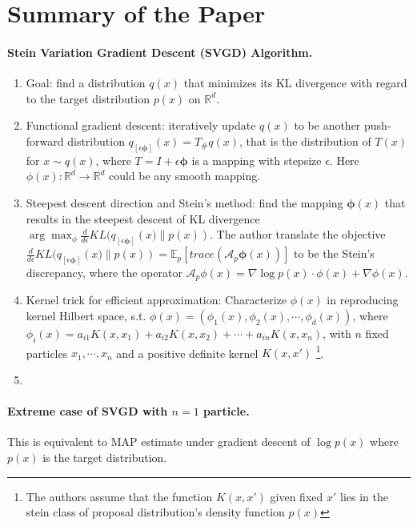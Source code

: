 \section{Summary of the Paper}

\paragraph{Stein Variation Gradient Descent (SVGD) Algorithm.}

\begin{enumerate}
    \item Goal: find a distribution $q(x)$ that minimizes its KL divergence with regard to the target distribution $p(x)$ on $\mathbb{R}^d$.
    \item Functional gradient descent: iteratively update $q(x)$ to be another push-forward distribution $q_{[\epsilon\mathbf{\phi}]}(x) = T_{\#}q(x)$, that is the distribution of $T(x)$ for $x\sim q(x)$, where $T= I + \epsilon \mathbf{\phi}$ is a mapping with stepsize $\epsilon$. Here $\phi(x): \mathbb{R}^d\rightarrow \mathbb{R}^d$ could be any smooth mapping.
    \item Steepest descent direction and Stein's method: find the mapping $\mathbf{\phi}(x)$ that results in the steepest descent of KL divergence $\arg\max_{\phi} \frac{d}{d \epsilon} KL(q_{[\epsilon\mathbf{\phi}]}\left(x)\lVert p(x)\right)$. The author translate the objective $\frac{d}{d \epsilon}KL(q_{[\epsilon\mathbf{\phi}]}\left(x)\lVert p(x)\right) = \mathbb{E}_p\left[trace\left(\mathcal{A}_p \mathbf{\phi}(x)\right)\right]$ to be the Stein's discrepancy, where the operator $\mathcal{A}_p \phi(x)= \nabla \log p(x) \cdot \phi(x) + \nabla\phi(x)$.
    \item Kernel trick for efficient approximation: Characterize $\phi(x)$ in reproducing kernel Hilbert space, s.t. $\phi(x) = \left(\phi_1(x), \phi_2(x), \cdots, \phi_d(x)\right)$, where $\phi_i(x) = a_{i1} K(x, x_1) + a_{i2} K(x, x_2) + \cdots + a_{in} K(x, x_n)$, with $n$ fixed particles $x_1,\cdots,x_n$ and a positive definite kernel $K(x,x')$ \footnote{The authors assume that the function $K(x, x')$ given fixed $x'$ lies in the stein class of proposal distribution's density function $p(x)$}.
    \item 
    
\end{enumerate}


\paragraph{Extreme case of SVGD with $n=1$ particle.} This is equivalent to MAP estimate under gradient descent of $\log p(x)$ where $p(x)$ is the target distribution.